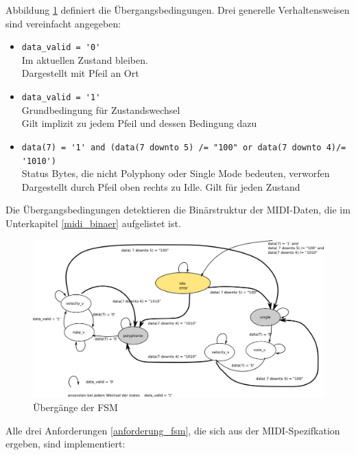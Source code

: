 Abbildung \ref{fig.midi_fsm_detail} definiert die Übergangsbedingungen. Drei generelle Verhaltensweisen sind vereinfacht angegeben:

\begin{itemize}
	\item \lstinline|data_valid = '0'|\\
        Im aktuellen Zustand bleiben.\\
        Dargestellt mit Pfeil an Ort
	\item \lstinline|data_valid = '1'|\\
        Grundbedingung für Zustandswechsel\\
        Gilt implizit zu jedem Pfeil und dessen Bedingung dazu
	\item \lstinline|data(7) = '1' and (data(7 downto 5) /= "100" or data(7 downto 4)/= '1010')| \\
        Status Bytes, die nicht Polyphony oder Single Mode bedeuten, verworfen\\
        Dargestellt durch Pfeil oben rechts zu Idle. Gilt für jeden Zustand
\end{itemize}
\bigskip

Die Übergangsbedingungen detektieren die Binärstruktur der MIDI-Daten, die im Unterkapitel \ref{midi_binaer} aufgelistet ist.

\begin{figure}[H]
	\includegraphics[width=1\textwidth]{images/midi_control/fsm_detailliert.png}
	\caption{Übergänge der FSM}
	\label{fig.midi_fsm_detail}
\end{figure}

Alle drei Anforderungen \ref{anforderung_fsm}, die sich aus der MIDI-Spezifkation ergeben, sind implementiert:

